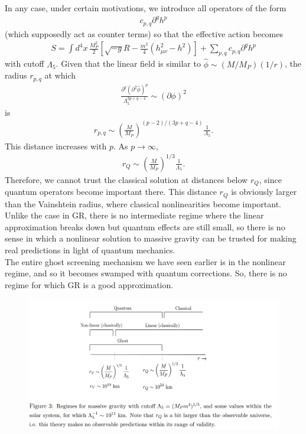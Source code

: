 \documentclass{book}
\theoremstyle{definition}
\newcommand{\p}{\partial}
\newcommand{\f}[2]{\frac{#1}{#2}}
\newcommand{\lp}{\left(}
\newcommand{\rp}{\right)}
\newcommand{\lb}{\left[}
\newcommand{\rb}{\right]}
\begin{document}
In any case, under certain motivations, we introduce all operators of the form 
\begin{align}
c_{p,q} \p^q h^p
\end{align}
(which supposedly act as counter terms) so that the effective action becomes
\begin{align}
S = \int d^4x\, \f{M_P^2}{2}\lb \sqrt{-g}R - \f{m^2}{4}(h_{\mu\nu}^2 - h^2) \rb + \sum_{p,q}c_{p,q}\p^q h^p
\end{align}
with cutoff $\Lambda_5$. Given that the linear field is similar to $\hat{\phi} \sim (M/M_P)(1/r)$, the radius $r_{p,q}$ at which 
\begin{align}
\f{\p^q (\p^2 \hat{\phi})^p}{\Lambda_5^{3p+q-4}} \sim (\p \phi)^2
\end{align}
is 
\begin{align}
r_{p,q} \sim \lp \f{M}{M_P} \rp^{(p-2)/(3p+q-4)}\f{1}{\Lambda_5}.
\end{align}
This distance increases with $p$. As $p \to \infty$,
\begin{align}
r_Q \sim \lp \f{M}{M_P} \rp^{1/3}\f{1}{\Lambda_5}.
\end{align}
Therefore, we cannot trust the classical solution at distances below $r_Q$, since quantum operators become important there. This distance $r_Q$ is obviously larger than the Vainshtein radius, where classical nonlinearities become important. Unlike the case in GR, there is no intermediate regime where the linear approximation breaks down but quantum effects are still small, so there is no sense in which a nonlinear solution to massive gravity can be trusted for making real predictions in light of quantum mechanics. \\

The entire ghost screening mechanism we have seen earlier is in the nonlinear regime, and so it becomes swamped with quantum corrections. So, there is no regime for which GR is a good approximation. 

\newpage
\begin{figure}[!htb]
	\centering
	\includegraphics[scale=0.65]{qm-cor}
\end{figure}
\end{document}
